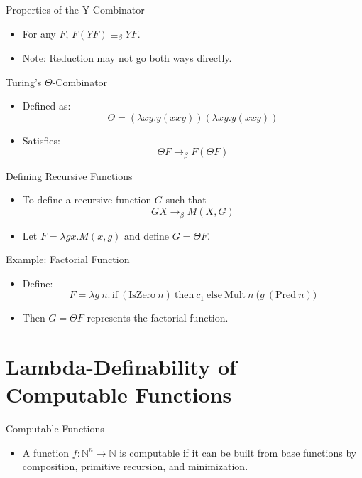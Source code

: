 \documentclass{beamer}
\begin{document}
\begin{frame}{Properties of the Y-Combinator}
  \begin{itemize}
    \item For any \(F\), \(F (Y F) \equiv_\beta Y F\).
    \item Note: Reduction may not go both ways directly.
  \end{itemize}
\end{frame}

\begin{frame}{Turing's $\Theta$-Combinator}
  \begin{itemize}
    \item Defined as:
      \[
      \Theta = (\lambda x y. y(x x y)) (\lambda x y. y(x x y))
      \]
    \item Satisfies:
      \[
      \Theta F \rightarrow_\beta F (\Theta F)
      \]
  \end{itemize}
\end{frame}

\begin{frame}{Defining Recursive Functions}
  \begin{itemize}
    \item To define a recursive function \(G\) such that
      \[
      G X \rightarrow_\beta M(X, G)
      \]
    \item Let \(F = \lambda g x. M(x, g)\) and define \(G = \Theta F\).
  \end{itemize}
\end{frame}

\begin{frame}{Example: Factorial Function}
  \begin{itemize}
    \item Define:
      \[
      F = \lambda g\ n.\, \text{if}\ (\text{IsZero}\ n)\ \text{then}\ c_1\ \text{else}\ \text{Mult}\ n\ \bigl(g\ (\text{Pred}\ n)\bigr)
      \]
    \item Then \(G = \Theta F\) represents the factorial function.
  \end{itemize}
  \vspace{-0.5em} %
\end{frame}

\section{Lambda-Definability of Computable Functions}
\begin{frame}{Computable Functions}
  \begin{itemize}
    \item A function \(f : \mathbb{N}^n \rightarrow \mathbb{N}\) is computable if it can be built from base functions by composition, primitive recursion, and minimization.
  \end{itemize}
\end{frame}
\end{document}
